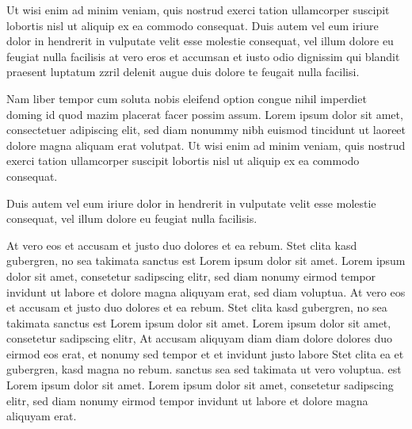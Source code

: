 \documentclass[]{../metanetpaper}
\begin{document}
\begin{Parallel}[c]{80mm}{80mm}
{    Ut wisi enim ad minim veniam, quis nostrud exerci tation ullamcorper suscipit lobortis nisl ut aliquip ex ea commodo consequat. Duis autem vel eum iriure dolor in hendrerit in vulputate velit esse molestie consequat, vel illum dolore eu feugiat nulla facilisis at vero eros et accumsan et iusto odio dignissim qui blandit praesent luptatum zzril delenit augue duis dolore te feugait nulla facilisi.   

    Nam liber tempor cum soluta nobis eleifend option congue nihil imperdiet doming id quod mazim placerat facer possim assum. Lorem ipsum dolor sit amet, consectetuer adipiscing elit, sed diam nonummy nibh euismod tincidunt ut laoreet dolore magna aliquam erat volutpat. Ut wisi enim ad minim veniam, quis nostrud exerci tation ullamcorper suscipit lobortis nisl ut aliquip ex ea commodo consequat.   

    Duis autem vel eum iriure dolor in hendrerit in vulputate velit esse molestie consequat, vel illum dolore eu feugiat nulla facilisis.   

    At vero eos et accusam et justo duo dolores et ea rebum. Stet clita kasd gubergren, no sea takimata sanctus est Lorem ipsum dolor sit amet. Lorem ipsum dolor sit amet, consetetur sadipscing elitr, sed diam nonumy eirmod tempor invidunt ut labore et dolore magna aliquyam erat, sed diam voluptua. At vero eos et accusam et justo duo dolores et ea rebum. Stet clita kasd gubergren, no sea takimata sanctus est Lorem ipsum dolor sit amet. Lorem ipsum dolor sit amet, consetetur sadipscing elitr, At accusam aliquyam diam diam dolore dolores duo eirmod eos erat, et nonumy sed tempor et et invidunt justo labore Stet clita ea et gubergren, kasd magna no rebum. sanctus sea sed takimata ut vero voluptua. est Lorem ipsum dolor sit amet. Lorem ipsum dolor sit amet, consetetur sadipscing elitr, sed diam nonumy eirmod tempor invidunt ut labore et dolore magna aliquyam erat.
  }

\end{Parallel}
\end{document}
